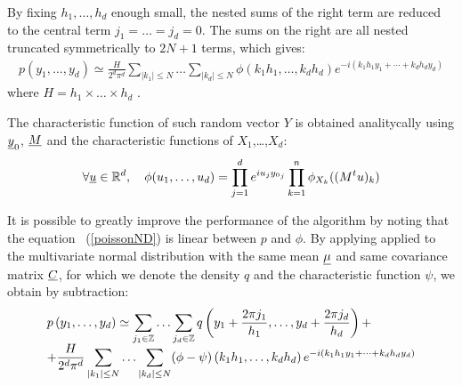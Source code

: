 By fixing $h_1,\hdots,h_d$ enough small, the nested sums of the right term are reduced to the central term $j_1=\hdots=j_d = 0$. 
The sums on the right are all nested truncated symmetrically to $ 2N +1 $ terms, which gives:
\begin{align}
  p\left(y_1,\hdots,y_d\right)\simeq\frac{H}{2^d\pi^d}\sum_{|k_1|\leq N}\hdots\sum_{|k_d|\leq N}\phi\left(k_1h_1,\hdots,k_dh_d\right)e^{-i(k_1h_1y_1+\cdots+k_dh_dy_d)}
\end{align}
where $H = h_1\times\hdots\times h_d$ .

The characteristic function of such random vector $Y$ is obtained analitycally using ${\underline{y}}_0$, ${\underline{M}}$ and the characteristic functions of $X_1$,\dots,$X_d$:
\begin{align}
  \forall {\underline{u}}\in\mathbb{R}^d,\quad\phi(u_1,\hdots,u_d)=\prod_{j=1}^de^{iu_j{y_0}_j}\prod_{k=1}^n\phi_{X_k}((M^tu)_k)
\end{align}


It is possible to greatly improve the performance of the algorithm by noting that the equation ~(\ref{poissonND}) is linear between $p$ 
and $\phi $. By applying applied to the multivariate normal distribution with the same mean ${\underline{\mu}}$ and same covariance matrix 
${\underline{C}} $, for which we denote the density $q$ and the characteristic function $\psi$, we obtain by subtraction:
\begin{align}\label{algoPoisson}
  \begin{array}{p{\textwidth}}
    \multicolumn{1}{l}{\displaystyle p\left(y_1,\hdots,y_d\right)\simeq \sum_{j_1\in\mathbb{Z}}\hdots\sum_{j_d\in\mathbb{Z}}q\left(y_1+\frac{2\pi j_1}{h_1},\hdots,y_d+\frac{2\pi j_d}{h_d}\right)+}\\
    \multicolumn{1}{r}{+\displaystyle \frac{H}{2^d\pi^d}\sum_{|k_1|\leq N}\hdots\sum_{|k_d|\leq N}(\phi-\psi)\left(k_1h_1,\hdots,k_dh_d\right)e^{-i(k_1h_1y_1+\cdots+k_dh_dy_d)}}
  \end{array}
\end{align}

